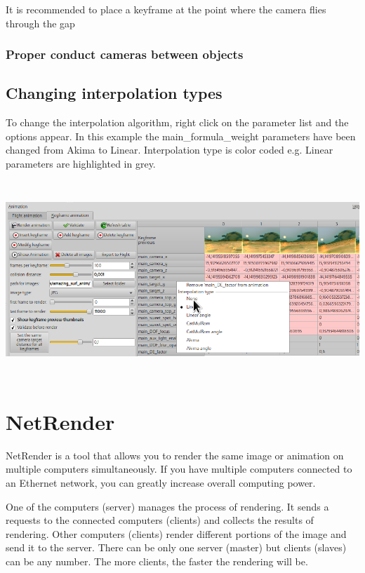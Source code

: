 It is recommended to place a keyframe at the point where the camera
flies through the gap

\subsubsection{Proper conduct cameras between
objects}\label{proper-conduct-cameras-between-objects}

\subsection{Changing interpolation
types}\label{changing-interpolation-types}

To change the interpolation algorithm, right click on the parameter list
and the options appear. In this example the main\_formula\_weight
parameters have been changed from Akima to Linear. Interpolation type is
color coded e.g. Linear parameters are highlighted in grey.

\includegraphics[width=6.69291in,height=2.92087in]{img/manual/media/image27.png}

\section{NetRender}\label{netrender}

NetRender is a tool that allows you to render the same image or
animation on multiple computers simultaneously. If you have multiple
computers connected to an Ethernet network, you can greatly increase
overall computing power.

One of the computers (server) manages the process of rendering. It sends
a requests to the connected computers (clients) and collects the results
of rendering. Other computers (clients) render different portions of the
image and send it to the server. There can be only one server (master)
but clients (slaves) can be any number. The more clients, the faster the
rendering will be.

